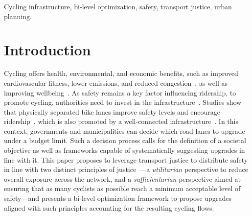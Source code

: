 \documentclass[letterpaper, 10 pt, conference]{ieeeconf}  %
\begin{document}
\begin{abstract}



\end{abstract}

\begin{keywords}
Cycling infrastructure, bi-level optimization,  safety, transport justice, urban planning.
\end{keywords}


\section{Introduction}
Cycling offers health, environmental, and economic benefits, such as improved cardiovascular fitness, lower emissions, and reduced congestion~\cite{garrard2012health}, as well as improving wellbeing~\cite{te2022have, kaplan2015intentions, lee2024assessing}.
As safety remains a key factor influencing ridership, to promote cycling, authorities need to invest in the infrastructure~\cite{fishman2012barriers}.
Studies show that physically separated bike lanes improve safety levels and encourage ridership~\cite{lawrence2018cyclist}, which is also promoted by a well-connected infrastructure~\cite{pucher2011walking}.
In this context, governments and municipalities can decide which road lanes to upgrade under a budget limit.
Such a decision process calls for the definition of a societal objective as well as frameworks capable of systematically suggesting upgrades in line with it.
This paper proposes to leverage transport justice to distribute safety in line with two distinct principles of justice~\cite{martens2017transport}---a \textit{utilitarian} perspective to reduce overall exposure across the network, and a \textit{sufficientarian} perspective aimed at ensuring that as many cyclists as possible reach a minimum acceptable level of safety---and presents a bi-level optimization framework to propose upgrades aligned with such principles accounting for the resulting cycling flows.
\end{document}
